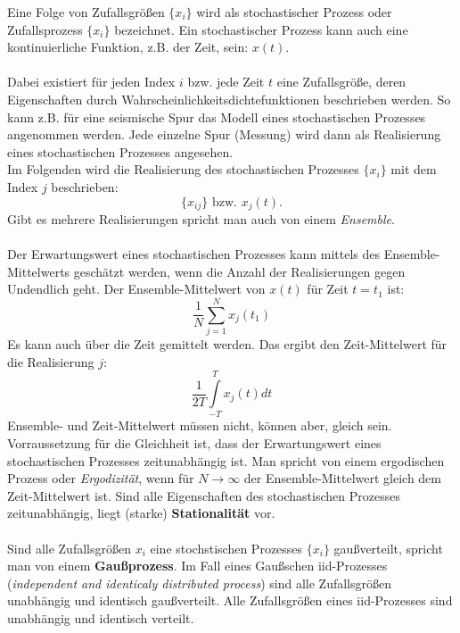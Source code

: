 Eine Folge von Zufallsgrößen $\{x_i\}$ wird als stochastischer Prozess oder Zufallsprozess $\{x_i\}$ bezeichnet. Ein stochastischer Prozess kann auch eine kontinuierliche Funktion, z.B. der Zeit, sein: $x(t)$.\\\\
Dabei existiert für jeden Index $i$ bzw. jede Zeit $t$ eine Zufallsgröße, deren Eigenschaften durch Wahrscheinlichkeitsdichtefunktionen beschrieben werden. So kann z.B. für eine seismische Spur das Modell eines stochastischen Prozesses angenommen werden. Jede einzelne Spur (Messung) wird dann als Realisierung eines stochastischen Prozesses angesehen.\\
Im Folgenden wird die Realisierung des stochastischen Prozesses $\{x_i\}$ mit dem Index $j$ beschrieben:
\[
\{x_{ij}\} \mbox{ bzw. }  x_j(t).
\]
Gibt es mehrere Realisierungen spricht man auch von einem \textit{Ensemble}.\\\\
Der Erwartungswert eines stochastischen Prozesses kann mittels des Ensemble-Mittelwerts geschätzt werden, wenn die Anzahl der Realisierungen gegen Undendlich geht. Der Ensemble-Mittelwert von $x(t)$ für Zeit $t=t_1$ ist:
\[
\frac{1}{N}\sum\limits_{j=1}^{N}x_j(t_1)
\]
Es kann auch über die Zeit gemittelt werden. Das ergibt den Zeit-Mittelwert für die Realisierung $j$:
\[
\frac{1}{2T}\int\limits_{-T}^{T}x_j(t)dt
\]
Ensemble- und Zeit-Mittelwert müssen nicht, können aber, gleich sein. Vorraussetzung für die Gleichheit ist, dass der Erwartungswert eines stochastischen Prozesses zeitunabhängig ist. Man spricht von einem ergodischen Prozess oder \textit{Ergodizität}, wenn für $N \to \infty$ der Ensemble-Mittelwert gleich dem Zeit-Mittelwert ist. Sind alle Eigenschaften des stochastischen Prozesses zeitunabhängig, liegt (starke) \textbf{Stationalität} vor.\\\\
Sind alle Zufallsgrößen $x_i$ eine stochstischen Prozesses $\{x_i\}$ gaußverteilt, spricht man von einem {\bf Gaußprozess}. Im Fall eines Gaußschen iid-Prozesses (\textsl{independent and identicaly distributed process}) sind alle Zufallsgrößen unabhängig und identisch gaußverteilt.
Alle Zufallsgrößen eines iid-Prozesses sind unabhängig und identisch verteilt.

\newpage


